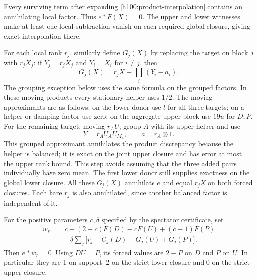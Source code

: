 \documentclass[11pt]{article}
\numberwithin{equation}{section}
\theoremstyle{definition}
\theoremstyle{remark}
\begin{document}
Every surviving term after expanding \eqref{h100:product-interpolation}
contains an annihilating local factor.  Thus $e*F(X)=0$.  The upper and
lower witnesses make at least one local subtraction vanish on each
required global closure, giving exact interpolation there.

For each local rank $r_j$, similarly define $G_j(X)$ by replacing the
target on block $j$ with $r_jX_j$: if $Y_j=r_jX_j$ and
$Y_i=X_i$ for $i\ne j$, then
\[
 G_j(X)=r_jX-\prod_i(Y_i-a_i).
\]
The grouping exception below uses the same formula on the grouped
factors.  In these moving products every
stationary helper uses $1/2$.  The moving approximants are as follows:
on the lower donor use $l$ for all three targets; on a helper or damping
factor use zero; on the aggregate upper block use $19u$ for $D,P$.
For the remaining target, moving $r_AU$, group $A$ with its upper
helper and use
\[
 Y=r_AU_AU_{M_u},\qquad a=r_A\otimes1.
\]
This grouped approximant annihilates the product discrepancy because
the helper is balanced; it is exact on the joint upper closure and
has error at most the upper rank bound.  This step avoids assuming
that the three added pairs individually have zero mean.  The first
lower donor still supplies exactness on the global lower closure.
All these $G_j(X)$ annihilate $e$ and equal $r_jX$ on both forced
closures.  Each bare $r_j$ is also annihilated, since another balanced
factor is independent of it.

For the positive parameters $c,\delta$ specified by the spectator
certificate, set
\begin{equation}\label{h100:rational-profile}
 \begin{split}
 w_r={}&c+(2-c)F(D)-cF(U)+(c-1)F(P)\\
       &-\delta\sum_j\bigl[r_j-G_j(D)-G_j(U)+G_j(P)\bigr].
 \end{split}
\end{equation}
Then $e*w_r=0$.  Using $DU=P$, its forced values are $2-P$ on $D$ and
$P$ on $U$.  In particular they are 1 on support, 2 on the strict
lower closure and 0 on the strict upper closure.
\end{document}
